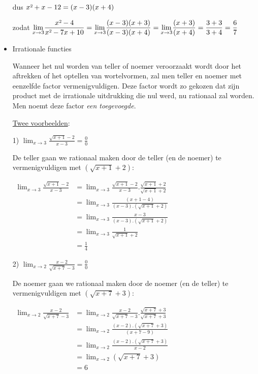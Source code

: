 \begin{itemize}
dus $x\text{\texttwosuperior}+x-12=(x-3)(x+4)$

zodat ${\displaystyle {\displaystyle \lim_{x\to3}}\frac{x\text{\texttwosuperior}-4}{x\text{\texttwosuperior}-7x+10}={\displaystyle \lim_{x\to3}}\frac{(x-3)(x+3)}{(x-3)(x+4)}={\displaystyle \lim_{x\to3}}\frac{(x+3)}{(x+4)}=\frac{3+3}{3+4}=\frac{6}{7}}$


\item{Irrationale functies}

Wanneer het nul worden van teller of noemer veroorzaakt wordt door
het aftrekken of het optellen van wortelvormen, zal men teller en
noemer met eenzelfde factor vermenigvuldigen. Deze factor wordt zo
gekozen dat zijn product met de irrationale uitdrukking die nul werd,
nu rationaal zal worden. Men noemt deze factor \emph{een toegevoegde}.


\uline{Twee voorbeelden}:




1) ${\displaystyle {\displaystyle \lim_{x\to3}}\frac{\sqrt{x+1}-2}{x-3}=\frac{0}{0}}$

De teller gaan we rationaal maken door de teller (en de noemer) te
vermenigvuldigen met $\left(\sqrt{x+1}+2\right)$:

$\begin{array}{cl}
{\displaystyle {\displaystyle \lim_{x\to3}}\frac{\sqrt{x+1}-2}{x-3}} & {\displaystyle ={\displaystyle \lim_{x\to3}}\frac{\sqrt{x+1}-2}{x-3}.\frac{\sqrt{x+1}+2}{\sqrt{x+1}+2}}\\
& {\displaystyle ={\displaystyle \lim_{x\to3}}\frac{\left(x+1-4\right)}{\left(x-3\right).\left(\sqrt{x+1}+2\right)}}\\
& {\displaystyle ={\displaystyle \lim_{x\to3}}\frac{x-3}{\left(x-3\right).\left(\sqrt{x+1}+2\right)}}\\
& {\displaystyle ={\displaystyle \lim_{x\to3}}\frac{1}{\sqrt{x+1}+2}}\\
& =\frac{1}{4}
\end{array}$




2) ${\displaystyle {\displaystyle \lim_{x\to2}}\frac{x-2}{\sqrt{x+7}-3}=\frac{0}{0}}$

De noemer gaan we rationaal maken door de noemer (en de teller) te
vermenigvuldigen met $\left(\sqrt{x+7}+3\right)$:

$\begin{array}{cl}
{\displaystyle {\displaystyle \lim_{x\to2}}\frac{x-2}{\sqrt{x+7}-3}} & {\displaystyle ={\displaystyle \lim_{x\to2}}\frac{x-2}{\sqrt{x+7}-3}.\frac{\sqrt{x+7}+3}{\sqrt{x+7}+3}}\\
& {\displaystyle ={\displaystyle \lim_{x\to2}}\frac{\left(x-2\right).\left(\sqrt{x+7}+3\right)}{\left(x+7-9\right)}}\\
& {\displaystyle ={\displaystyle \lim_{x\to2}}\frac{\left(x-2\right).\left(\sqrt{x+7}+3\right)}{x-2}}\\
& {\displaystyle ={\displaystyle \lim_{x\to2}}\left(\sqrt{x+7}+3\right)}\\
& =6
\end{array}$
\end{itemize}


